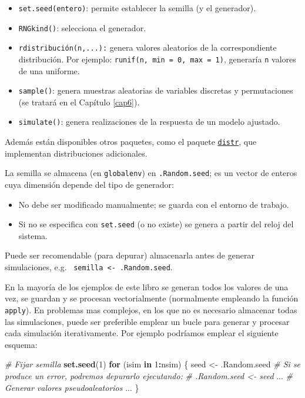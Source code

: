 \documentclass[
]{book}
\newenvironment{Shaded}{\begin{snugshade}}{\end{snugshade}}
\newcommand{\CommentTok}[1]{\textcolor[rgb]{0.56,0.35,0.01}{\textit{#1}}}
\newcommand{\ControlFlowTok}[1]{\textcolor[rgb]{0.13,0.29,0.53}{\textbf{#1}}}
\newcommand{\DecValTok}[1]{\textcolor[rgb]{0.00,0.00,0.81}{#1}}
\newcommand{\KeywordTok}[1]{\textcolor[rgb]{0.13,0.29,0.53}{\textbf{#1}}}
\newcommand{\NormalTok}[1]{#1}
\newcommand{\OperatorTok}[1]{\textcolor[rgb]{0.81,0.36,0.00}{\textbf{#1}}}
\newcommand{\StringTok}[1]{\textcolor[rgb]{0.31,0.60,0.02}{#1}}
\theoremstyle{break}
\theoremstyle{definition}
\theoremstyle{definition}
\theoremstyle{definition}
\theoremstyle{remark}
\let\BeginKnitrBlock\begin \let\EndKnitrBlock\end
\begin{document}
\begin{itemize}
\item
  \texttt{set.seed(entero)}: permite establecer la semilla (y el
  generador).
\item
  \texttt{RNGkind()}: selecciona el generador.
\item
  \texttt{rdistribución(n,...):} genera valores aleatorios de la
  correspondiente distribución.
  Por ejemplo: \texttt{runif(n,\ min\ =\ 0,\ max\ =\ 1)}, generaría \texttt{n} valores de una uniforme.
\item
  \texttt{sample()}: genera muestras aleatorias de variables discretas y permutaciones (se tratará en el Capítulo \ref{cap6}).
\item
  \texttt{simulate()}: genera realizaciones de la respuesta de un modelo ajustado.
\end{itemize}

Además están disponibles otros paquetes, como el paquete \href{http://distr.r-forge.r-project.org}{\texttt{distr}},
que implementan distribuciones adicionales.

La semilla se almacena (en \texttt{globalenv}) en \texttt{.Random.seed}; es un vector
de enteros cuya dimensión depende del tipo de generador:

\begin{itemize}
\item
  No debe ser modificado manualmente; se guarda con el entorno
  de trabajo.
\item
  Si no se especifica con \texttt{set.seed} (o no existe) se genera a
  partir del reloj del sistema.
\end{itemize}

\BeginKnitrBlock{remark}
\iffalse{} {Nota: } \fi{}Puede ser recomendable (para depurar) almacenarla antes de generar simulaciones, e.g.~
\texttt{semilla\ \textless{}-\ .Random.seed}.
\EndKnitrBlock{remark}

En la mayoría de los ejemplos de este libro se generan todos los valores de una vez,
se guardan y se procesan vectorialmente (normalmente empleando la función \texttt{apply}).
En problemas mas complejos, en los que no es necesario almacenar todas las simulaciones,
puede ser preferible emplear un bucle para generar y procesar cada simulación iterativamente.
Por ejemplo podríamos emplear el siguiente esquema:

\begin{Shaded}
\begin{Highlighting}[]
\CommentTok{# Fijar semilla}
\KeywordTok{set.seed}\NormalTok{(}\DecValTok{1}\NormalTok{)}
\ControlFlowTok{for}\NormalTok{ (isim }\ControlFlowTok{in} \DecValTok{1}\OperatorTok{:}\NormalTok{nsim) \{}
\NormalTok{  seed <-}\StringTok{ }\NormalTok{.Random.seed}
  \CommentTok{# Si se produce un error, podremos depurarlo ejecutando:}
  \CommentTok{#  .Random.seed <- seed}
\NormalTok{  ...}
  \CommentTok{# Generar valores pseudoaleatorios}
\NormalTok{  ...}
\NormalTok{\}}
\end{Highlighting}
\end{Shaded}
\end{document}
